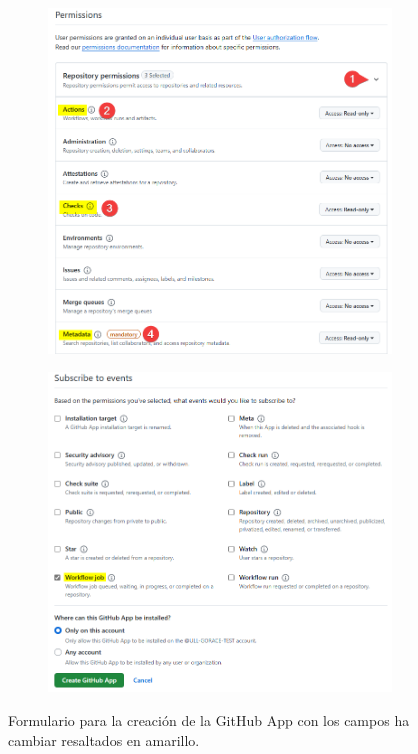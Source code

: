 \begin{figure}
\begin{subfigure}{0.24\textwidth}
    \end{subfigure}
    \hspace*{\fill}   %
    \begin{subfigure}{0.24\textwidth}
        \includegraphics[width=\linewidth]{images/create-app-form-3.png}
    \end{subfigure}
    \hspace*{\fill}   %
    \begin{subfigure}{0.24\textwidth}
        \includegraphics[width=\linewidth]{images/create-app-form-4.png}
    \end{subfigure}
    \caption{Formulario para la creación de la GitHub App con los campos ha cambiar resaltados en amarillo.}
\end{figure}


